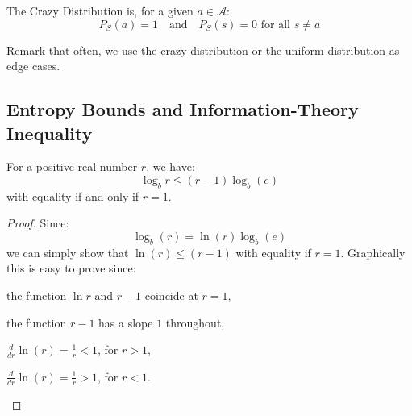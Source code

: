 \begin{definition}
    The Crazy Distribution is, for a given $a \in \mathcal{A}$:
    \[
        P_S (a) = 1 \quad \text{and} \quad P_S(s) = 0 \text{ for all $s \neq a$}
    \]
\end{definition}
Remark that often, we use the crazy distribution or the uniform distribution as edge cases.

\subsection{Entropy Bounds and Information-Theory Inequality}

\begin{theorem}[IT Inequality]
    For a positive real number $r$, we have:
    \[
        \log_b r \leq (r - 1) \log_b(e)
    \]
    with equality if and only if $r = 1$.
\end{theorem}
\begin{proof}
    Since:
    \[
        \log_b (r) = \ln (r) \log_b(e)
    \]
    we can simply show that $\ln(r) \leq (r - 1)$ with equality if $r = 1$. Graphically this is easy to prove since:
    \begin{citemize}
        \item the function $\ln r$ and $r -1$ coincide at $r = 1$,
        \item the function $r - 1$ has a slope $1$ throughout,
        \item $\frac{d}{dr} \ln(r) = \frac{1}{r} < 1$, for $r > 1$,
        \item $\frac{d}{dr} \ln(r) = \frac{1}{r} > 1$, for $r < 1$.
    \end{citemize}
\end{proof}

